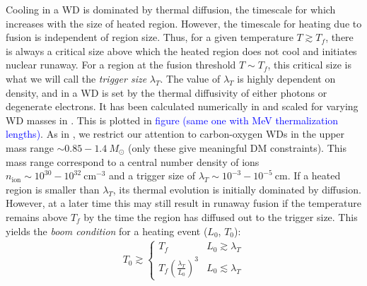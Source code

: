 \documentclass[twocolumn,preprintnumbers,amsmath,amssymb,prd, superscriptaddress]{revtex4} %
\newcommand{\cm}{\text{cm}}
\begin{document}
Cooling in a WD is dominated by thermal diffusion, the timescale for which increases with the size of heated region.
However, the timescale for heating due to fusion is independent of region size.
Thus, for a given temperature $T\gtrsim T_f$, there is always a critical size above which the heated region does not cool and initiates nuclear runaway.
For a region at the fusion threshold $T \sim T_f$, this critical size is what we will call the \emph{trigger size} $\lambda_T$.
The value of $\lambda_T$ is highly dependent on density, and in a WD is set by the thermal diffusivity of either photons or degenerate electrons.
It has been calculated numerically in \cite{Woosley} and scaled for varying WD masses in \cite{Graham:2015apa}.
This is plotted in \textcolor{blue}{figure (same one with MeV thermalization lengths)}.
As in \cite{Graham:2015apa}, we restrict our attention to carbon-oxygen WDs in the upper mass range $\sim 0.85 - 1.4 ~M_{\odot}$ (only these give meaningful DM constraints).
This mass range correspond to a central number density of ions $n_\text{ion} \sim 10^{30} - 10^{32} ~\cm^{-3}$ and a trigger size of $\lambda_T \sim 10^{-3} - 10^{-5} ~\text{cm}$.
If a heated region is smaller than $\lambda_T$, its thermal evolution is initially dominated by diffusion.
However, at a later time this may still result in runaway fusion if the temperature remains above $T_f$ by the time the region has diffused out to the trigger size.
This yields the \emph{boom condition} for a heating event ($L_0$, $T_0$):
\begin{align}
    \label{eq:energy_boom_condition_condition}
    T_0 \gtrsim \begin{cases}
      T_f & L_0 \gtrsim \lambda_T \\
      T_f \left( \frac{\lambda_T}{L_0} \right)^3 & L_0 \lesssim \lambda_T
    \end{cases}
\end{align}
\end{document}
